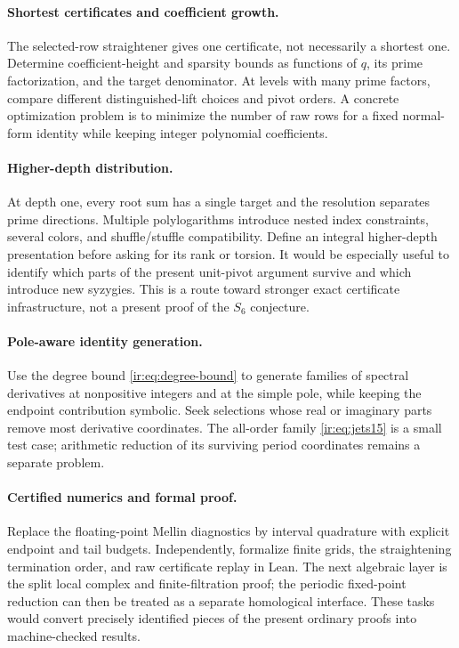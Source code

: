 \paragraph{Shortest certificates and coefficient growth.}
The selected-row straightener gives one certificate, not necessarily
a shortest one. Determine coefficient-height and sparsity bounds as
functions of $q$, its prime factorization, and the target denominator.
At levels with many prime factors, compare different distinguished-lift
choices and pivot orders. A concrete optimization problem is to minimize
the number of raw rows for a fixed normal-form identity while keeping
integer polynomial coefficients.

\paragraph{Higher-depth distribution.}
At depth one, every root sum has a single target and the resolution
separates prime directions. Multiple polylogarithms introduce nested
index constraints, several colors, and shuffle/stuffle compatibility.
Define an integral higher-depth presentation before asking for its
rank or torsion. It would be especially useful to identify which
parts of the present unit-pivot argument survive and which introduce
new syzygies. This is a route toward stronger exact certificate
infrastructure, not a present proof of the $S_6$ conjecture.

\paragraph{Pole-aware identity generation.}
Use the degree bound \eqref{ir:eq:degree-bound} to generate families of
spectral derivatives at nonpositive integers and at the simple pole,
while keeping the endpoint contribution symbolic. Seek selections
whose real or imaginary parts remove most derivative coordinates.
The all-order family \eqref{ir:eq:jets15} is a small test case;
arithmetic reduction of its surviving period coordinates remains a
separate problem.

\paragraph{Certified numerics and formal proof.}
Replace the floating-point Mellin diagnostics by interval quadrature
with explicit endpoint and tail budgets. Independently, formalize
finite grids, the straightening termination order, and raw certificate
replay in Lean. The next algebraic layer is the split local complex
and finite-filtration proof; the periodic fixed-point reduction can
then be treated as a separate homological interface. These tasks would
convert precisely identified pieces of the present ordinary proofs
into machine-checked results.

